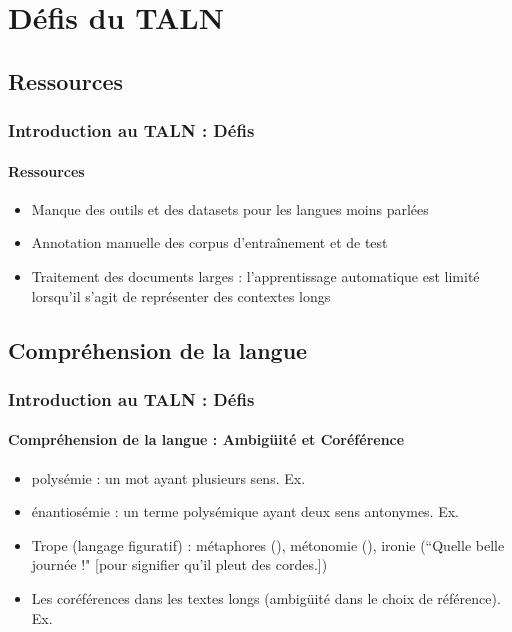 \documentclass[xcolor=table]{beamer}
\begin{document}
\section{Défis du TALN}

%

\subsection{Ressources}

\begin{frame}
\frametitle{Introduction au TALN : Défis}
\framesubtitle{Ressources}

\begin{itemize}
	\item Manque des outils et des datasets pour les langues moins parlées
	\item Annotation manuelle des corpus d'entraînement et de test
	\item Traitement des documents larges : l'apprentissage automatique est limité lorsqu'il s'agit de représenter des contextes longs 
\end{itemize}
\end{frame}

\subsection{Compréhension de la langue}

\begin{frame}
\frametitle{Introduction au TALN : Défis}
\framesubtitle{Compréhension de la langue : Ambigüité et Coréférence}

\begin{itemize}
	\item polysémie : un mot ayant plusieurs sens. Ex. 
	\item énantiosémie : un terme polysémique ayant deux sens antonymes. Ex. 
	\item Trope (langage figuratif) : métaphores (), métonomie (), ironie (``Quelle belle journée !" [pour signifier qu'il pleut des cordes.])
	\item Les coréférences dans les textes longs (ambigüité dans le choix de référence). 
	Ex. 
\end{itemize}

\end{frame}
\end{document}
